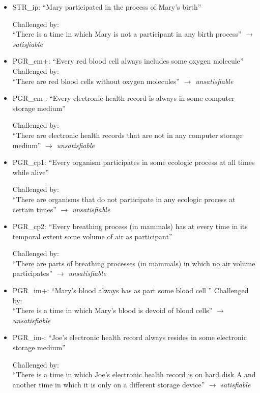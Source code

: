 \begin{itemize}
\item STR\_ip:  ``Mary participated in the process of Mary's birth''

Challenged by: \\``There is a time in which Mary is not a participant in any birth process''  
$\rightarrow$ \emph{satisfiable}



\item PGR\_cm+: ``Every red blood cell always includes some oxygen molecule''
Challenged by: \\``There are red blood cells without oxygen molecules''  
$\rightarrow$ \emph{unsatisfiable}


\item PGR\_cm-: ``Every electronic health record is always in some computer storage medium''

Challenged by: \\``There are electronic health records that are not in any computer storage medium''  
$\rightarrow$ \emph{unsatisfiable}


\item PGR\_cp1: ``Every organism participates in some ecologic process at all times while alive''

Challenged by: \\``There are organisms that do not participate in any ecologic process at certain times''  
$\rightarrow$ \emph{unsatisfiable}


\item PGR\_cp2: ``Every breathing process (in mammals) has at every time in its temporal extent some volume of air as participant'' 


Challenged by: \\``There are parts of breathing processes (in mammals) in which no air volume participates''  
$\rightarrow$ \emph{unsatisfiable}


\item PGR\_im+: ``Mary's blood always has as part some blood cell ''
Challenged by: \\``There is a time in which Mary's blood is devoid of blood cells''  
$\rightarrow$ \emph{unsatisfiable}

\item PGR\_im-: ``Joe's electronic health record always resides in some electronic storage medium''

Challenged by: \\``There is a time in which Joe's electronic health record is on hard disk A and another time in which it is only on a different storage device''  
$\rightarrow$ \emph{satisfiable}



\end{itemize}
